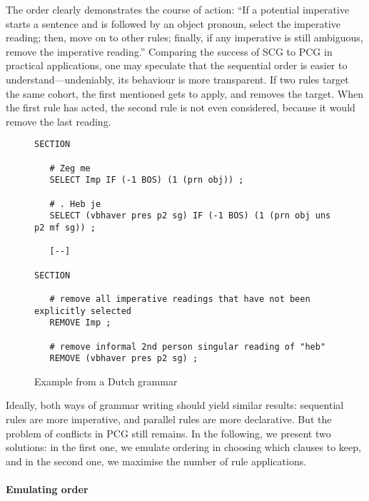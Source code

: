 The order clearly demonstrates the course of action: ``If a potential imperative starts a sentence and is followed by an object pronoun, select the imperative reading; then, move on to other rules; finally, if any imperative is still ambiguous, remove the imperative reading.''
Comparing the success of SCG to PCG in practical applications, one may speculate that the sequential order is easier to understand---undeniably, its behaviour is more transparent. %
If two rules target the same cohort, the first mentioned gets to apply, and removes the target. When the first rule has acted, the second rule is not even considered, because it would remove the last reading.




\begin{figure}[ht]
\centering
   \begin{verbatim}
SECTION

   # Zeg me
   SELECT Imp IF (-1 BOS) (1 (prn obj)) ;

   # . Heb je
   SELECT (vbhaver pres p2 sg) IF (-1 BOS) (1 (prn obj uns p2 mf sg)) ;

   [--]

SECTION

   # remove all imperative readings that have not been explicitly selected
   REMOVE Imp ;

   # remove informal 2nd person singular reading of "heb"
   REMOVE (vbhaver pres p2 sg) ;

   \end{verbatim}
\caption{Example from a Dutch grammar}
\label{fig:ruleOrder}
\end{figure}


Ideally, both ways of grammar writing should yield similar results:
sequential \onlycg{} rules are more imperative, and parallel \onlycg{} rules are more declarative.
But the problem of conflicts in PCG still remains.
In the following, we present two solutions:
in the first one, we emulate ordering in choosing which clauses to keep, and in the second one, we maximise the number of rule applications.



\paragraph{Emulating order}

